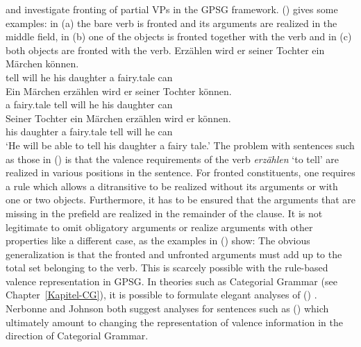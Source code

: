 \citet{Nerbonne86a} and \citet{Johnson86a} investigate fronting of partial VPs in the GPSG
framework.
() gives some examples: in (a) the bare verb is fronted and its arguments are realized
in the middle field, in (b) one of the objects is fronted together with the verb and in
(c) both objects are fronted with the verb.
\eal
\ex 
\gll Erzählen wird er seiner Tochter ein Märchen können.\\
     tell will he his daughter a fairy.tale can\\
\ex 
\gll Ein Märchen erzählen wird er seiner Tochter können.\\
     a fairy.tale tell will he his daughter can\\
\ex 
\gll Seiner Tochter ein Märchen erzählen wird er können.\\
     his daughter a fairy.tale tell will he can\\
\glt `He will be able to tell his daughter a fairy tale.'
\zl
The problem with sentences such as those in () is that the valence requirements of the verb
\emph{erzählen} `to tell' are realized in various positions in the sentence. For fronted
constituents, one requires a rule which allows a ditransitive to be realized without its arguments
or with one or two objects. Furthermore, it has to be ensured that the arguments that are
missing in the prefield are realized in the remainder of the clause. It is not legitimate to omit
obligatory arguments or realize arguments with other properties like a different case, as the
examples in () show:
\eal
{}
\zl
The obvious generalization is that the fronted and unfronted arguments must add up to the total
set belonging to the verb. This is scarcely possible with the rule-based valence
representation in GPSG. In theories such as Categorial Grammar (see
Chapter~\ref{Kapitel-CG}), it is possible to formulate elegant analyses of ()
\citep{Geach70a}. Nerbonne and Johnson both suggest analyses for sentences such as () which
ultimately amount to changing the representation of valence information in the direction of
Categorial Grammar. 

